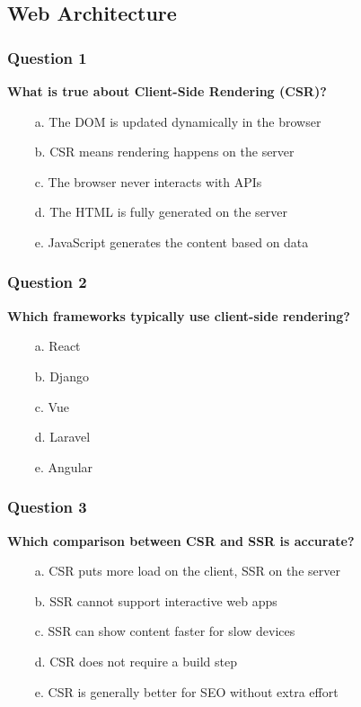 \documentclass{article}
\newcommand{\cmark}{\textcolor{green}{\ding{51}}} %
\newcommand{\xmark}{\textcolor{red}{\ding{55}}}   %
\begin{document}
\subsection{Web Architecture}

\subsubsection*{Question 1}
\textbf{What is true about Client-Side Rendering (CSR)?}

\begin{itemize}
  \item[\cmark\ a.] The DOM is updated dynamically in the browser
  \item[\xmark\ b.] CSR means rendering happens on the server
  \item[\xmark\ c.] The browser never interacts with APIs
  \item[\xmark\ d.] The HTML is fully generated on the server
  \item[\cmark\ e.] JavaScript generates the content based on data
\end{itemize}

\subsubsection*{Question 2}
\textbf{Which frameworks typically use client-side rendering?}

\begin{itemize}
  \item[\cmark\ a.] React
  \item[\xmark\ b.] Django
  \item[\cmark\ c.] Vue
  \item[\xmark\ d.] Laravel
  \item[\cmark\ e.] Angular
\end{itemize}

\subsubsection*{Question 3}
\textbf{Which comparison between CSR and SSR is accurate?}

\begin{itemize}
  \item[\cmark\ a.] CSR puts more load on the client, SSR on the server
  \item[\xmark\ b.] SSR cannot support interactive web apps
  \item[\cmark\ c.] SSR can show content faster for slow devices
  \item[\xmark\ d.] CSR does not require a build step
  \item[\xmark\ e.] CSR is generally better for SEO without extra effort
\end{itemize}
\end{document}

